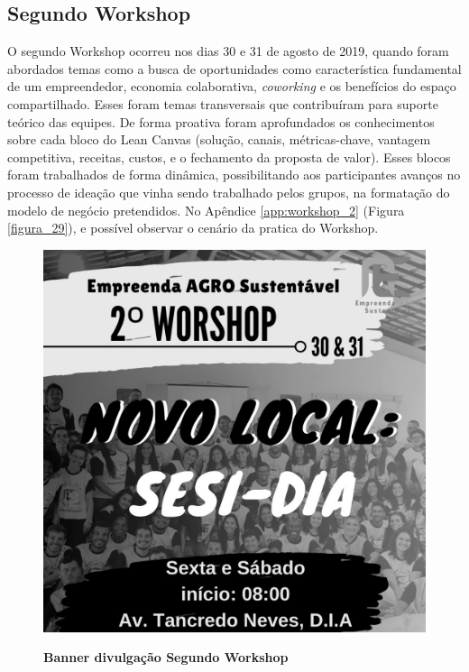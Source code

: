 \subsection{Segundo Workshop}


O segundo Workshop ocorreu nos dias 30 e 31 de agosto de 2019, quando foram abordados temas como a busca de oportunidades como característica fundamental de um empreendedor, economia colaborativa, \textit{coworking} e os benefícios do espaço compartilhado. Esses foram temas transversais que contribuíram para suporte teórico das equipes. De forma proativa foram aprofundados os conhecimentos sobre cada bloco do Lean Canvas (solução, canais, métricas-chave, vantagem competitiva, receitas, custos, e o fechamento da proposta de valor). Esses blocos foram trabalhados de forma dinâmica, possibilitando aos participantes avanços no processo de ideação que vinha sendo trabalhado pelos grupos, na formatação do modelo de negócio pretendidos. No Apêndice \ref{app:workshop_2}  (Figura \ref{figura_29}), 
e possível observar o cenário da pratica do Workshop.
 

\begin{figure}[H]
\centering
\caption{\textbf{Banner divulgação Segundo Workshop}}
\includegraphics[scale=0.2]{Imagens/2_workshop.jpg}
\label{fig:ods}
\end{figure}

